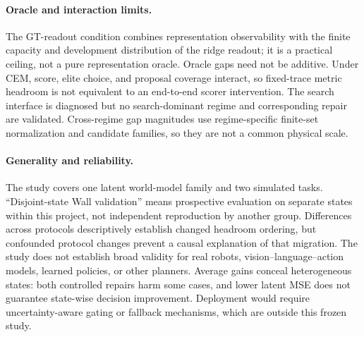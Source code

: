 \paragraph{Oracle and interaction limits.}
The GT-readout condition combines representation observability with the finite capacity and development distribution of the ridge readout; it is a practical ceiling, not a pure representation oracle. Oracle gaps need not be additive. Under CEM, score, elite choice, and proposal coverage interact, so fixed-trace metric headroom is not equivalent to an end-to-end scorer intervention. The search interface is diagnosed but no search-dominant regime and corresponding repair are validated. Cross-regime gap magnitudes use regime-specific finite-set normalization and candidate families, so they are not a common physical scale.

\paragraph{Generality and reliability.}
The study covers one latent world-model family and two simulated tasks. ``Disjoint-state Wall validation'' means prospective evaluation on separate states within this project, not independent reproduction by another group. Differences across protocols descriptively establish changed headroom ordering, but confounded protocol changes prevent a causal explanation of that migration. The study does not establish broad validity for real robots, vision--language--action models, learned policies, or other planners. Average gains conceal heterogeneous states: both controlled repairs harm some cases, and lower latent MSE does not guarantee state-wise decision improvement. Deployment would require uncertainty-aware gating or fallback mechanisms, which are outside this frozen study.
